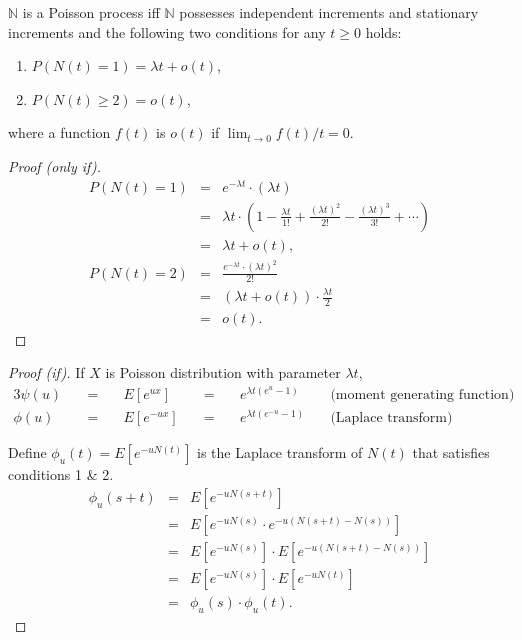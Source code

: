 \begin{theorem}[操作型定義] \label{thm:op_def}
$ \mathbb{N} $ is a Poisson process iff $ \mathbb{N} $ possesses independent increments and stationary increments and the following two conditions for any $ t \ge 0 $ holds:
\begin{enumerate}
  \item $ P(N(t) = 1) = \lambda t + o(t) $,
  \item $ P(N(t) \ge 2) = o(t) $,
\end{enumerate}
where a function $ f(t) $ is $ o(t) $ if $ \lim_{t \to 0} f(t) / t = 0 $.

\begin{proof}[Proof (only if)]
\begin{eqnarray*}
P(N(t) = 1)
  & = & e^{-\lambda t} \cdot (\lambda t) \\
  & = & \lambda t \cdot \left( 1 - \frac{\lambda t}{1!} + \frac{(\lambda t)^{2}}{2!} - \frac{(\lambda t)^{3}}{3!} + \cdots \right) \\
  & = & \lambda t + o(t), \\
P(N(t) = 2)
  & = & \frac{e^{-\lambda t} \cdot (\lambda t)^{2}}{2!} \\
  & = & (\lambda t + o(t)) \cdot \frac{\lambda t}{2} \\
  & = & o(t).
\end{eqnarray*}
\end{proof}

\begin{proof}[Proof (if)]
If $ X $ is Poisson distribution with parameter $ \lambda t $,
\begin{alignat*}{3}
\psi(u) & \quad=\quad & E[e^{ux}] & \quad=\quad & e^{\lambda t (e^{u} - 1)} & \quad\text{(moment generating function)} \\
\phi(u) & \quad=\quad & E[e^{-ux}] & \quad=\quad & e^{\lambda t (e^{-u} - 1)} & \quad\text{(Laplace transform)}
\end{alignat*}

Define $ \phi_{u}(t) = E[e^{-uN(t)}] $ is the Laplace transform of $ N(t) $ that satisfies conditions 1 \& 2.
\begin{eqnarray*}
\phi_{u}(s + t)
  & = & E[e^{-uN(s + t)}] \\
  & = & E[e^{-uN(s)} \cdot e^{-u(N(s + t) - N(s))}] \\
  & = & E[e^{-uN(s)}] \cdot E[e^{-u(N(s + t) - N(s))}] \\
  & = & E[e^{-uN(s)}] \cdot E[e^{-uN(t)}] \\
  & = & \phi_{u}(s) \cdot \phi_{u}(t).
\end{eqnarray*}


\end{proof}
\end{theorem}
